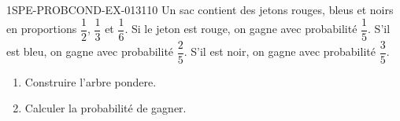 \begin{exercice}{1SPE-PROBCOND-EX-013}{1}{10}
Un sac contient des jetons rouges, bleus et noirs en proportions $\dfrac{1}{2}$, $\dfrac{1}{3}$ et $\dfrac{1}{6}$. Si le jeton est rouge, on gagne avec probabilité $\dfrac{1}{5}$. S'il est bleu, on gagne avec probabilité $\dfrac{2}{5}$. S'il est noir, on gagne avec probabilité $\dfrac{3}{5}$.

\begin{enumerate}
  \item Construire l'arbre pondere.
  \item Calculer la probabilité de gagner.
\end{enumerate}
\end{exercice}
